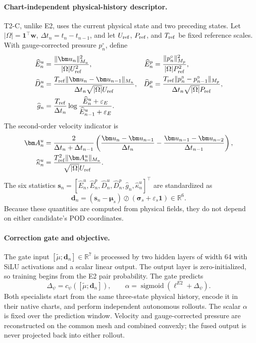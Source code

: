 \paragraph{Chart-independent physical-history descriptor.}
T2-C, unlike E2, uses the current physical state and two preceding states.
Let $|\Omega|=\bm 1^\top\bm w$, $\Delta t_n=t_n-t_{n-1}$, and let
$U_{\rm ref}$, $P_{\rm ref}$, and $T_{\rm ref}$ be fixed reference scales.
With gauge-corrected pressure $p_n^\circ$, define
\begin{align}
 \widehat E_n^u&=\frac{\|\bm u_n\|_{M_u}^2}{|\Omega|U_{\rm ref}^2},
 &\widehat E_n^p&=\frac{\|p_n^\circ\|_{M_p}^2}{|\Omega|P_{\rm ref}^2},\label{eq:app_t2c_energy}\\
 \widehat D_n^u&=\frac{T_{\rm ref}\|\bm u_n-\bm u_{n-1}\|_{M_u}}
 {\Delta t_n\sqrt{|\Omega|}U_{\rm ref}},
 &\widehat D_n^p&=\frac{T_{\rm ref}\|p_n^\circ-p_{n-1}^\circ\|_{M_p}}
 {\Delta t_n\sqrt{|\Omega|}P_{\rm ref}},\label{eq:app_t2c_rate}\\
 \widehat g_n&=\frac{T_{\rm ref}}{\Delta t_n}
 \log\frac{\widehat E_n^u+\varepsilon_E}{\widehat E_{n-1}^u+\varepsilon_E}.
 \label{eq:app_t2c_growth}
\end{align}
The second-order velocity indicator is
\begin{align}
 \bm A_n^u&=\frac{2}{\Delta t_n+\Delta t_{n-1}}
 \left(\frac{\bm u_n-\bm u_{n-1}}{\Delta t_n}
 -\frac{\bm u_{n-1}-\bm u_{n-2}}{\Delta t_{n-1}}\right),\\
 \widehat\kappa_n^u&=
 \frac{T_{\rm ref}^2\|\bm A_n^u\|_{M_u}}
 {\sqrt{|\Omega|}U_{\rm ref}}.
 \label{eq:app_t2c_curvature}
\end{align}
The six statistics
$\bm s_n=[\widehat E_n^u,\widehat E_n^p,\widehat D_n^u,
\widehat D_n^p,\widehat g_n,\widehat\kappa_n^u]^\top$ are standardized as
\begin{equation}
 \bm d_n=(\bm s_n-\bm\mu_s)\oslash
 (\bm\sigma_s+\varepsilon_s\bm 1)\in\mathbb R^6.
 \label{eq:app_t2c_descriptor}
\end{equation}
Because these quantities are computed from physical fields, they do not
depend on either candidate's POD coordinates.

\paragraph{Correction gate and objective.}
The gate input $[\widetilde\mu;\bm d_n]\in\mathbb R^7$ is processed by two
hidden layers of width 64 with SiLU activations and a scalar linear output.
The output layer is zero-initialized, so training begins from the E2 pair
probability. The gate predicts
\begin{equation}
 \Delta_\psi=c_\psi([\widetilde\mu;\bm d_n]),\qquad
 \alpha=\operatorname{sigmoid}(\ell^{E2}+\Delta_\psi).
 \label{eq:app_t2c_gate}
\end{equation}
Both specialists start from the same three-state physical history, encode it
in their native charts, and perform independent autonomous rollouts. The
scalar $\alpha$ is fixed over the prediction window. Velocity and
gauge-corrected pressure are reconstructed on the common mesh and combined
convexly; the fused output is never projected back into either rollout.

